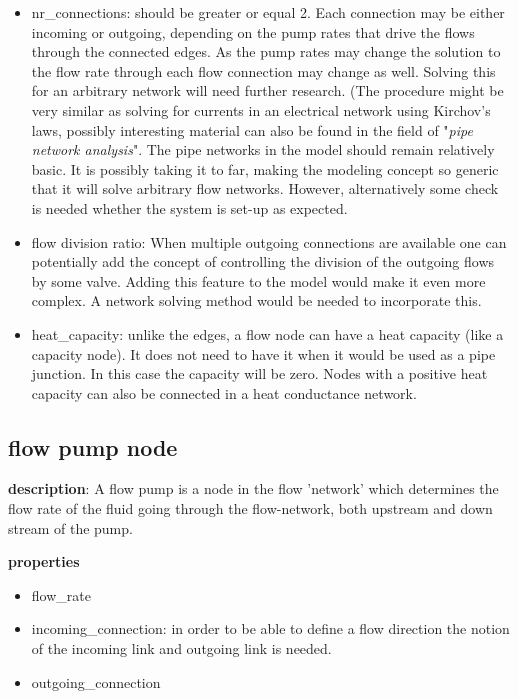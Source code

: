 \begin{itemize}
	\item nr\_connections: should be greater or equal 2. Each connection may be either incoming or outgoing, depending on the pump rates that drive the flows through the connected edges. As the pump rates may change the solution to the flow rate through each flow connection may change as well. Solving this for an arbitrary network will need further research. (The procedure might be very similar as solving for currents in an electrical network using Kirchov's laws, possibly interesting material can also be found in the field of "\textit{pipe network analysis}". The pipe networks in the model should remain relatively basic. It is possibly taking it to far, making the modeling concept so generic that it will solve arbitrary flow networks. However, alternatively some check is needed whether the system is set-up as expected. 
	\item flow division ratio: When multiple outgoing connections are available one can potentially add the concept of controlling the division of the outgoing flows by some valve. Adding this feature to the model would make it even more complex. A network solving method would be needed to incorporate this. 
	\item heat\_capacity: unlike the edges, a flow node can have a heat capacity (like a capacity node). It does not need to have it when it would be used as a pipe junction. In this case the capacity will be zero. Nodes with a positive heat capacity can also be connected in a heat conductance network. 
\end{itemize}

\subsection{flow pump node}
\textbf{description}: A flow pump is a node in the flow 'network' which determines the flow rate of the fluid going through the flow-network, both upstream and down stream of the pump. 

\textbf{properties}
\begin{itemize}
	\item flow\_rate
	\item incoming\_connection: in order to be able to define a flow direction the notion of the incoming link and outgoing link is needed. 
	\item outgoing\_connection
\end{itemize}  

